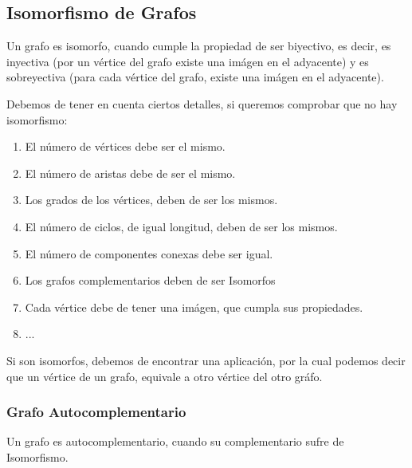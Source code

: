 \subsection{Isomorfismo de Grafos}
Un grafo es isomorfo, cuando cumple la propiedad de ser biyectivo, es decir, es inyectiva (por un vértice del grafo existe una imágen en el adyacente) y es sobreyectiva (para cada vértice del grafo, existe una imágen en el adyacente).
\par
Debemos de tener en cuenta ciertos detalles, si queremos comprobar que no hay isomorfismo:
\begin{enumerate}
        \item El número de vértices debe ser el mismo.
        \item El número de aristas debe de ser el mismo.
        \item Los grados de los vértices, deben de ser los mismos.
        \item El número de ciclos, de igual longitud, deben de ser los mismos.
        \item El número de componentes conexas debe ser igual.
        \item Los grafos complementarios deben de ser Isomorfos
        \item Cada vértice debe de tener una imágen, que cumpla sus propiedades.
        \item ...
\end{enumerate}
Si son isomorfos, debemos de encontrar una aplicación, por la cual podemos decir que un vértice de un grafo, equivale a otro vértice del otro gráfo.
\subsubsection{Grafo Autocomplementario}
Un grafo es autocomplementario, cuando su complementario sufre de Isomorfismo.